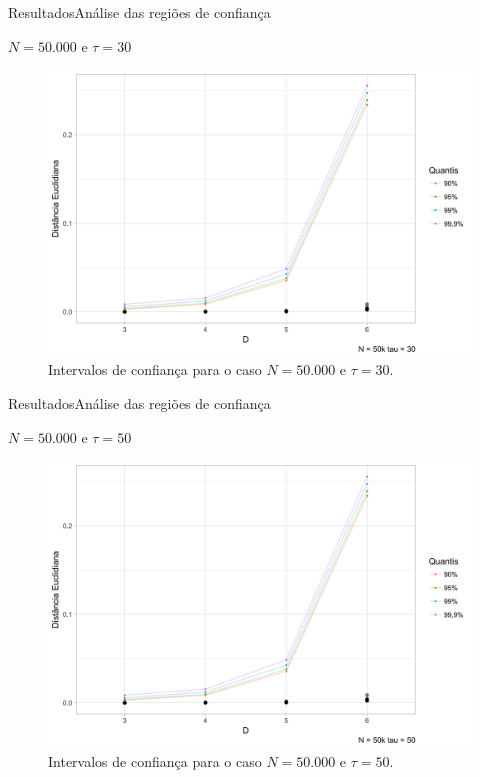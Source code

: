 \documentclass[10pt,xcolor={dvipsnames}]{beamer}
\begin{document}
\begin{frame}{Resultados}{Análise das regiões de confiança}
	\begin{block}{$N=50.000$ e $\tau=30$}
	\begin{figure}
		\centering
		\includegraphics[width=.7\linewidth]{Conf_Int_50k_T30_noMT}
		\caption{Intervalos de confiança para o caso $N=50.000$ e $\tau=30$.}\label{Fig:Conf_Int_50k_30}
	\end{figure}
	\end{block}
\end{frame}

\begin{frame}{Resultados}{Análise das regiões de confiança}
	\begin{block}{$N=50.000$ e $\tau=50$}
	\begin{figure}
		\centering
		\includegraphics[width=.7\linewidth]{Conf_Int_50k_T50_noMT}
		\caption{Intervalos de confiança para o caso $N=50.000$ e $\tau=50$.}\label{Fig:Conf_Int_50k_T50}
	\end{figure}	
	\end{block}
\end{frame}
\end{document}
